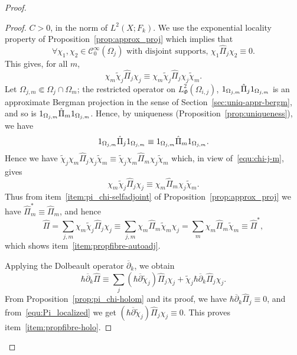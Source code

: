 \documentclass{article}
\newcommand{\dbar}{\overline\partial}
\newcommand{\Cinf}{\mathscr{C}^\infty}
\newcommand{\h}{\hbar}
\begin{document}
\begin{proof}
\begin{proof}
    $C>0$, in the norm of $L^2(X;F_k)$.  We use the exponential
    locality property of Proposition~\ref{prop:approx_proj} which
    implies that
    \begin{equation}
      \label{equ:Pi_localized}
      \forall \chi_{1}, \chi_2 \in \Cinf_0(\Omega_j) \text{ with disjoint supports, } \chi_1 \hat\Pi_j \chi_2 \equiv 0.
    \end{equation}
    This gives, for all $m$,
    \begin{equation}
      \label{equ:chi-j-m}
      \chi_m \tilde\chi_j  \hat \Pi_{j} \chi_j 
      \equiv \chi_m \tilde\chi_j  \hat \Pi_{j} \chi_j\tilde\chi_m.
    \end{equation}
    Let $\Omega_{j,m}\Subset \Omega_j\cap \Omega_m$; the restricted
    operator on $L^2_\Phi(\Omega_{i,j})$,
    $\textup{1}_{\Omega_{j,m}}\hat\Pi_j\textup{1}_{\Omega_{j,m}}$ is
    an approximate Bergman projection in the sense of
    Section~\ref{sec:uniq-appr-bergm}, and so is
    $\textup{1}_{\Omega_{j,m}}\hat\Pi_m\textup{1}_{\Omega_{j,m}}$.
    Hence, by uniqueness (Proposition~\ref{prop:uniqueness}), we have
    \[
    \textup{1}_{\Omega_{j,m}}\hat\Pi_j\textup{1}_{\Omega_{j,m}} \equiv
    \textup{1}_{\Omega_{j,m}}\hat\Pi_m\textup{1}_{\Omega_{j,m}}.
    \]
    Hence we have
    $\tilde\chi_j \chi_m \hat \Pi_{j} \chi_j\tilde\chi_m \equiv
    \tilde\chi_j \chi_m \hat \Pi_{m} \chi_j\tilde\chi_m$
    which, in view of~\eqref{equ:chi-j-m}, gives
    \[
    \chi_m \tilde\chi_j \hat \Pi_{j} \chi_j \equiv \chi_m \hat \Pi_{m}
    \chi_j \tilde\chi_m.
    \]
    Thus from item~\ref{item:pi_chi-selfadjoint} of
    Proposition~\ref{prop:approx_proj} we have
    $\hat\Pi_m^* \equiv \hat\Pi_m$, and hence
    \[
    \hat\Pi = \sum_{j,m} \chi_m \tilde\chi_j \hat \Pi_{j} \chi_j
    \equiv \sum_{j,m} \chi_m \hat \Pi_{m} \tilde\chi_m \chi_j = \sum_m
    \chi_m \hat \Pi_{m} \tilde\chi_m \equiv \hat\Pi^*,
    \]
    which shows item~\ref{item:propfibre-autoadj}.
    
    Applying the Dolbeault operator $\dbar_{k}$, we obtain
    \[
    \h\dbar_k \hat\Pi \equiv \sum_j (\h\dbar\tilde\chi_j) \hat \Pi_{j}
    \chi_j + \tilde\chi_j \h\dbar_k\hat \Pi_{j} \chi_j.
    \]
    From Proposition~\ref{prop:pi_chi-holom} and its proof, we have
    $\h\dbar_k\hat \Pi_{j}\equiv 0$, and from~\eqref{equ:Pi_localized}
    we get $(\h\dbar\tilde\chi_j) \hat \Pi_{j} \chi_j \equiv 0$.  This
    proves item~\ref{item:propfibre-holo}.


\end{proof}
\end{proof}
\end{document}
